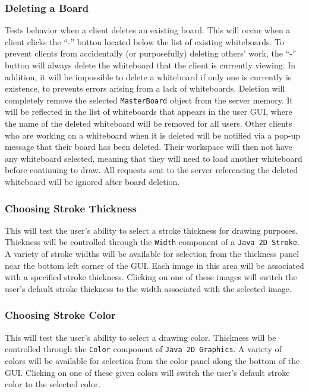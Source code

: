 \subsubsection{Deleting a Board}
Tests behavior when a client deletes an existing board. This will occur when a client clicks the “-” button located below the list of existing whiteboards.  To prevent clients from accidentally (or purposefully) deleting others’ work, the “-” button will always delete the whiteboard that the client is currently viewing. In addition, it will be impossible to delete a whiteboard if only one is currently is existence, to prevents errors arising from a lack of whiteboards.  Deletion will completely remove the selected \texttt{MasterBoard} object from the server memory. It will be reflected in the list of whiteboards that appears in the user GUI, where the name of the deleted whiteboard will be removed for all users. Other clients who are working on a whiteboard when it is deleted will be notified via a pop-up message that their board has been deleted.  Their workspace will then not have any whiteboard selected, meaning that they will need to load another whiteboard before continuing to draw.  All requests sent to the server referencing the deleted whiteboard will be ignored after board deletion.

\subsubsection{Choosing Stroke Thickness}
This will test the user’s ability to select a stroke thickness for drawing purposes. Thickness will be controlled through the \texttt{Width} component of a \texttt{Java 2D Stroke}. A variety of stroke widths will be available for selection from the thickness panel near the bottom left corner of the GUI. Each image in this area will be associated with a specified stroke thickness. Clicking on one of these images will switch the user’s default stroke thickness to the width associated with the selected image.

\subsubsection{Choosing Stroke Color}
This will test the user’s ability to select a drawing color. Thickness will be controlled through the \texttt{Color} component of \texttt{Java 2D Graphics}. A variety of colors will be available for selection from the color panel along the bottom of the GUI. Clicking on one of these given colors will switch the user’s default stroke color to the selected color.

